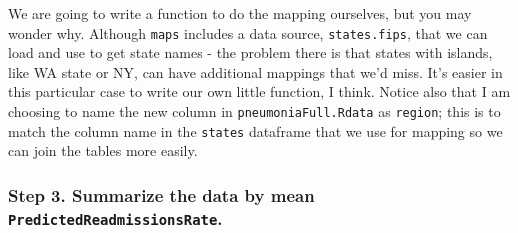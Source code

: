 \documentclass[
]{article}
\newenvironment{Shaded}{\begin{snugshade}}{\end{snugshade}}
\newcommand{\AttributeTok}[1]{\textcolor[rgb]{0.13,0.29,0.53}{#1}}
\newcommand{\CommentTok}[1]{\textcolor[rgb]{0.56,0.35,0.01}{\textit{#1}}}
\newcommand{\ConstantTok}[1]{\textcolor[rgb]{0.56,0.35,0.01}{#1}}
\newcommand{\FunctionTok}[1]{\textcolor[rgb]{0.13,0.29,0.53}{\textbf{#1}}}
\newcommand{\NormalTok}[1]{#1}
\newcommand{\OtherTok}[1]{\textcolor[rgb]{0.56,0.35,0.01}{#1}}
\newcommand{\SpecialCharTok}[1]{\textcolor[rgb]{0.81,0.36,0.00}{\textbf{#1}}}
\newcommand{\StringTok}[1]{\textcolor[rgb]{0.31,0.60,0.02}{#1}}
\begin{document}
We are going to write a function to do the mapping ourselves, but you
may wonder why. Although \texttt{maps} includes a data source,
\texttt{states.fips}, that we can load and use to get state names - the
problem there is that states with islands, like WA state or NY, can have
additional mappings that we'd miss. It's easier in this particular case
to write our own little function, I think. Notice also that I am
choosing to name the new column in \texttt{pneumoniaFull.Rdata} as
\texttt{region}; this is to match the column name in the \texttt{states}
dataframe that we use for mapping so we can join the tables more easily.

\subsubsection{\texorpdfstring{Step 3. Summarize the data by mean
\texttt{PredictedReadmissionsRate}.}{Step 3. Summarize the data by mean PredictedReadmissionsRate.}}\label{step-3.-summarize-the-data-by-mean-predictedreadmissionsrate.}

\begin{Shaded}
\end{Shaded}
\end{document}
